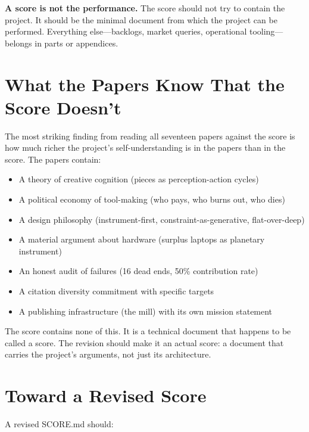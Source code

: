 \documentclass[10pt,letterpaper,twocolumn]{article}
\begin{document}
\textbf{A score is not the performance.} The score should not try to contain the project. It should be the minimal document from which the project can be performed. Everything else---backlogs, market queries, operational tooling---belongs in parts or appendices.

\section{What the Papers Know That the Score Doesn't}

The most striking finding from reading all seventeen papers against the score is how much richer the project's self-understanding is in the papers than in the score. The papers contain:

\begin{itemize}
\item A theory of creative cognition (pieces as perception-action cycles)
\item A political economy of tool-making (who pays, who burns out, who dies)
\item A design philosophy (instrument-first, constraint-as-generative, flat-over-deep)
\item A material argument about hardware (surplus laptops as planetary instrument)
\item An honest audit of failures (16 dead ends, 50\% contribution rate)
\item A citation diversity commitment with specific targets
\item A publishing infrastructure (the mill) with its own mission statement
\end{itemize}

The score contains none of this. It is a technical document that happens to be called a score. The revision should make it an actual score: a document that carries the project's arguments, not just its architecture.

\section{Toward a Revised Score}

A revised SCORE.md should:
\end{document}
